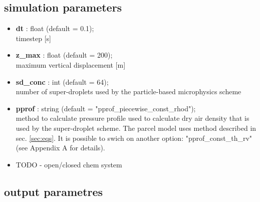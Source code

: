 \documentclass[11pt]{article}
\begin{document}
\subsection{simulation parameters}\label{sec:simpar}

\begin{itemize}

  \item \textbf{dt} : float (default = 0.1); \\ timestep [s]
  \item \textbf{z\_max} : float (default = 200); \\ maximum vertical displacement [m]
  \item \textbf{sd\_conc} : int (default = 64); \\ number of super-droplets used by the particle-based microphysics scheme
  \item \textbf{pprof} : string (default = "pprof\_piecewise\_const\_rhod"); \\ 
                method to calculate pressure profile used to calculate 
                dry air density that is used by the super-droplet scheme. The parcel model uses method described in sec. \ref{sec:eqs}. It is possible to swich on another option: "pprof\_const\_th\_rv" (see Appendix A for details).
  \item TODO - open/closed chem system
\end{itemize}

\subsection{output parametres}\label{sec:output}
\end{document}
